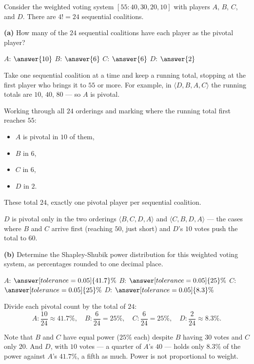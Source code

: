 \documentclass[12pt]{ximera}
\begin{document}
\begin{problem}
Consider the weighted voting system $[55:40,30,20,10]$ with players $A$, $B$, $C$, and
$D$. There are $4! = 24$ sequential coalitions.

\begin{prompt}
\textbf{(a)} How many of the $24$ sequential coalitions have each player as the
pivotal player?

$A$: $\answer{10}$ \qquad $B$: $\answer{6}$ \qquad $C$: $\answer{6}$ \qquad $D$: $\answer{2}$

\begin{hint}
Take one sequential coalition at a time and keep a running total, stopping at the
first player who brings it to $55$ or more. For example, in
$\langle D, B, A, C\rangle$ the running totals are $10$, $40$, $80$ --- so $A$ is
pivotal.
\end{hint}

\begin{feedback}
Working through all $24$ orderings and marking where the running total first reaches
$55$:
\begin{itemize}
\item $A$ is pivotal in $10$ of them,
\item $B$ in $6$,
\item $C$ in $6$,
\item $D$ in $2$.
\end{itemize}
These total $24$, exactly one pivotal player per sequential coalition. \checkmark

$D$ is pivotal only in the two orderings $\langle B,C,D,A\rangle$ and
$\langle C,B,D,A\rangle$ --- the cases where $B$ and $C$ arrive first (reaching $50$,
just short) and $D$'s $10$ votes push the total to $60$.
\end{feedback}
\end{prompt}

\begin{prompt}
\textbf{(b)} Determine the Shapley-Shubik power distribution for this weighted voting
system, as percentages rounded to one decimal place.

$A$: $\answer[tolerance=0.05]{41.7}\%$ \qquad
$B$: $\answer[tolerance=0.05]{25}\%$ \qquad
$C$: $\answer[tolerance=0.05]{25}\%$ \qquad
$D$: $\answer[tolerance=0.05]{8.3}\%$

\begin{feedback}
Divide each pivotal count by the total of $24$:
\[
A: \frac{10}{24}\approx 41.7\%, \quad
B: \frac{6}{24}=25\%, \quad
C: \frac{6}{24}=25\%, \quad
D: \frac{2}{24}\approx 8.3\%.
\]

Note that $B$ and $C$ have equal power ($25\%$ each) despite $B$ having $30$ votes and
$C$ only $20$. And $D$, with $10$ votes --- a quarter of $A$'s $40$ --- holds only
$8.3\%$ of the power against $A$'s $41.7\%$, a fifth as much. Power is not
proportional to weight.
\end{feedback}
\end{prompt}
\end{problem}
\end{document}
